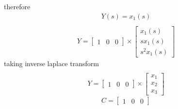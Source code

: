 \begin{enumerate}[label=\thesection.\arabic*.,ref=\thesection.\theenumi]
 therefore \begin{align} Y(s)=x_{1}(s) \end{align}
\begin{gather}
\\Y=
\begin{bmatrix}
1&0&0
\end{bmatrix}\times \begin{bmatrix}
x_{1}(s)\\
sx_{1}(s)\\
s^2x_{1}(s)
\end{bmatrix} 
\end{gather}
taking inverse laplace transform
\begin{gather}
\\Y=
\begin{bmatrix}
1&0&0
\end{bmatrix}\times \begin{bmatrix}
x_{1}\\
x_{2}\\
x_{3}
\end{bmatrix} 
\end{gather}
\begin{equation}
C=\begin{bmatrix}
1&0&0
\end{bmatrix}
\end{equation}
%

%
\end{enumerate}

